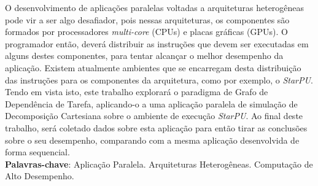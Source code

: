 
\begin{resumo}[RESUMO]
\begin{SingleSpacing}


O desenvolvimento de aplicações paralelas voltadas a arquiteturas heterogêneas pode vir a ser algo desafiador, pois nessas arquiteturas, os componentes são formados por processadores \emph{multi-core} (CPUs) e placas gráficas (GPUs).
O programador então, deverá distribuir as instruções que devem ser executadas em alguns destes componentes, para tentar alcançar o melhor desempenho da aplicação.
Existem atualmente ambientes que se encarregam desta distribuição das instruções para os componentes da arquitetura, como por exemplo, o \emph{StarPU}. 
Tendo em vista isto, este trabalho explorará o paradigma de Grafo de Dependência de Tarefa, aplicando-o a uma aplicação paralela de simulação de Decomposição Cartesiana sobre o ambiente de execução \emph{StarPU}.
Ao final deste trabalho, será coletado dados sobre esta aplicação para então tirar as conclusões sobre o seu desempenho, comparando com a mesma aplicação desenvolvida de forma sequencial.\\

\textbf{Palavras-chave}: Aplicação Paralela. Arquiteturas Heterogêneas. Computação de Alto Desempenho.

\end{SingleSpacing}
\end{resumo}